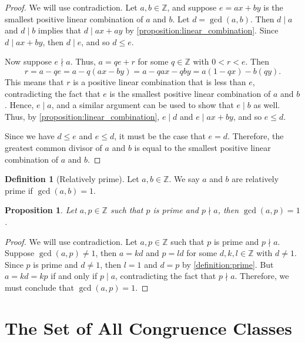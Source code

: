 \documentclass[12pt, titlepage]{amsart}
\newcommand\Z{{\mathbb Z}}
\newtheorem{prop}{Proposition}[subsection]
\theoremstyle{definition}
\newtheorem{definition}{Definition}[subsection]
\begin{document}
	\begin{proof}
		We will use contradiction.
		Let $a,b \in \Z$, and suppose $e=ax+by$ is the smallest positive linear combination of $a$ and $b$.
		Let $d = \gcd(a,b)$. Then $d \mid a$ and $d \mid b$ implies that $d \mid ax + ay$ by 		\cref{proposition:linear_combination}.
		Since $d \mid ax+by$, then $d \mid e$, and so $d \leq e$.
		
		Now suppose $e \nmid a$. Thus, $a = qe + r$ for some $q \in \Z$ with $0 < r < e$. Then 
		$$r = a-qe = a-q(ax-by) = a-qax-qby = a(1-qx)- b(qy).$$
		This means that $r$ is a positive linear combination that is less than $e$, contradicting the fact that $e$ is the smallest positive linear combination of $a$ and $b$. Hence, $e \mid a$, and a similar argument can be used to show that $e \mid b$ as well. Thus, by \cref{proposition:linear_combination}, $e \mid d$ and $e \mid ax + by$, and so $e \leq d$.
		
		Since we have $d \leq e$ and $e \leq d$, it must be the case that $e=d$. Therefore, the greatest common divisor of $a$ and $b$ is equal to the smallest positive linear combination of $a$ and $b$.
	\end{proof}
	
	\begin{definition}[Relatively prime]\label{definition:relatively_prime}
		Let $a, b \in \Z$. We say $a$ and $b$ are relatively prime if $\gcd(a,b)=1$. 
	\end{definition}
	
	\begin{prop}\label{prop:gcd(a,p)=1}
		Let $a, p \in \Z$ such that $p$ is prime and $p \nmid a$, then $\gcd(a,p) = 1$.
	\end{prop}
	
	\begin{proof}
		We will use contradiction. 
		Let $a, p \in \Z$ such that $p$ is prime and $p \nmid a$. 
		Suppose $\gcd(a,p) \neq 1$, then $a = kd$ and $p = ld$ for some $d,k,l \in \Z$ with $d \neq 1$.
		Since $p$ is prime and $d \neq 1$, then $l=1$ and $d=p$ by \cref{definition:prime}.
		But $a=kd=kp$ if and only if $p \mid a$, contradicting the fact that $p \nmid a$.
		Therefore, we must conclude that $\gcd(a,p) = 1$.
	\end{proof}
	

	
	\section{The Set of All Congruence Classes}
	
\end{document}
